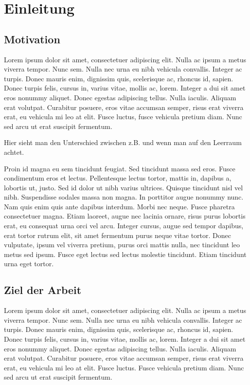\chapter{Einleitung}
\label{cha:Einleitung}

\section{Motivation}
Lorem ipsum dolor sit amet, consectetuer adipiscing elit. Nulla ac ipsum a metus viverra tempor. Nunc sem. Nulla nec urna eu nibh vehicula convallis. Integer ac turpis. Donec mauris enim, dignissim quis, scelerisque ac, rhoncus id, sapien. Donec turpis felis, cursus in, varius vitae, mollis ac, lorem. Integer a dui sit amet eros nonummy aliquet. Donec egestas adipiscing tellus. Nulla iaculis. Aliquam erat volutpat. Curabitur posuere, eros vitae accumsan semper, risus erat viverra erat, eu vehicula mi leo at elit. Fusce luctus, \zB fusce vehicula pretium diam. Nunc sed arcu ut erat suscipit fermentum. 

Hier sieht man den Unterschied zwischen z.B. und \zB wenn man auf den Leerraum achtet.

Proin id magna eu sem tincidunt feugiat. Sed tincidunt massa sed eros. Fusce condimentum eros et lectus. Pellentesque lectus tortor, mattis in, dapibus a, lobortis ut, justo. Sed id dolor ut nibh varius ultrices. Quisque tincidunt nisl vel nibh. Suspendisse sodales massa non magna. In porttitor augue nonummy nunc. Nam quis enim quis ante dapibus interdum. Morbi nec neque. Fusce pharetra consectetuer magna. Etiam laoreet, augue nec lacinia ornare, risus purus lobortis erat, eu consequat urna orci vel arcu. Integer cursus, augue sed tempor dapibus, erat tortor rutrum elit, sit amet fermentum purus neque vitae tortor. Donec vulputate, ipsum vel viverra pretium, purus orci mattis nulla, nec tincidunt leo metus sed ipsum.  Fusce eget lectus sed lectus molestie tincidunt. Etiam tincidunt urna eget tortor.


\section{Ziel der Arbeit}
Lorem ipsum dolor sit amet, consectetuer adipiscing elit. Nulla ac ipsum a metus viverra tempor. Nunc sem. Nulla nec urna eu nibh vehicula convallis. Integer ac turpis. Donec mauris enim, dignissim quis, scelerisque ac, rhoncus id, sapien. Donec turpis felis, cursus in, varius vitae, mollis ac, lorem. Integer a dui sit amet eros nonummy aliquet. Donec egestas adipiscing tellus. Nulla iaculis. Aliquam erat volutpat. Curabitur posuere, eros vitae accumsan semper, risus erat viverra erat, eu vehicula mi leo at elit. Fusce luctus. Fusce vehicula pretium diam. Nunc sed arcu ut erat suscipit fermentum.


